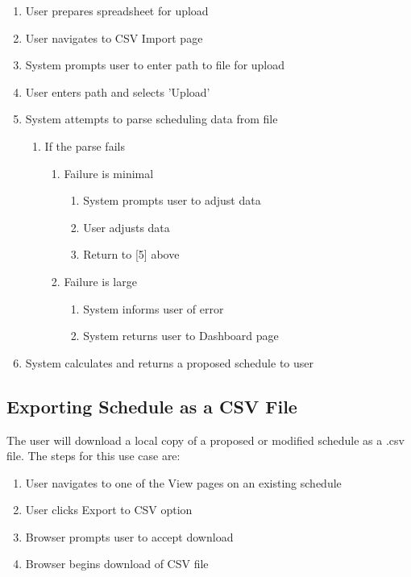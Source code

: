 \documentclass{extarticle}
\begin{document}
\begin{appendices}
\begin{enumerate}
    \item User prepares spreadsheet for upload
    \item User navigates to CSV Import page
    \item System prompts user to enter path to file for upload
    \item User enters path and selects 'Upload'
    \item System attempts to parse scheduling data from file
        \begin{enumerate}
            \item If the parse fails
            \begin{enumerate}
                \item Failure is minimal
                \begin{enumerate}
                    \item System prompts user to adjust data
                    \item User adjusts data
                    \item Return to [5] above
                \end{enumerate}
                \item Failure is large
                \begin{enumerate}
                    \item System informs user of error
                    \item System returns user to Dashboard page
                \end{enumerate}
            \end{enumerate}
        \end{enumerate}
    \item System calculates and returns a proposed schedule to user
\end{enumerate}

\subsection{Exporting Schedule as a CSV File}
The user will download a local copy of a proposed or modified schedule as a .csv file.  The steps for this use
case are:

\begin{enumerate}
    \item User navigates to one of the View pages on an existing schedule
    \item User clicks Export to CSV option
    \item Browser prompts user to accept download
    \item Browser begins download of CSV file
\end{enumerate}


\end{appendices}
\end{document}
